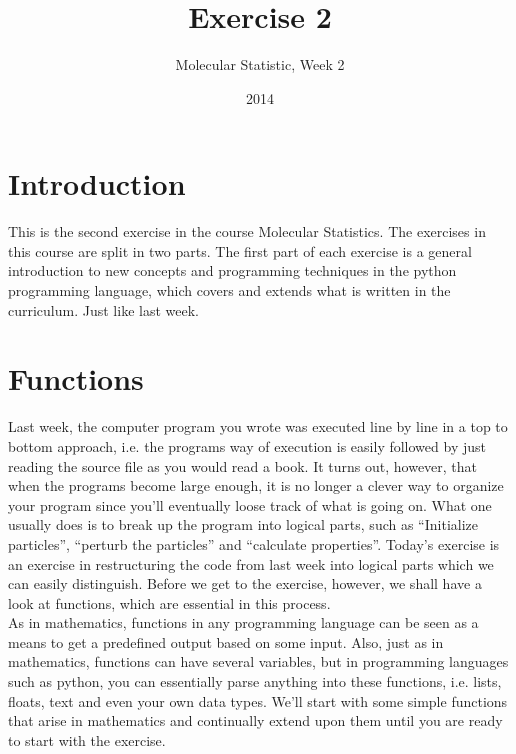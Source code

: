 \documentclass{article}
\title{Exercise 2}
\author{Molecular Statistic, Week 2}
\date{2014}
\begin{document}

\maketitle

\section{Introduction}

This is the second exercise in the course Molecular Statistics. The exercises
in this course are split in two parts. The first part of each exercise is a
general introduction to new concepts and programming techniques in the python
programming language, which covers and extends what is written in the
curriculum.
Just like last week.

\section{Functions}

Last week, the computer program you wrote was executed line by line in a top to
bottom approach, i.e. the programs way of execution is easily followed by just
reading the source file as you would read a book. It turns out, however, that
when the programs become large enough, it is no longer a clever way to organize
your program since you'll eventually loose track of what is going on. What one
usually does is to break up the program into logical parts, such as “Initialize
particles”, “perturb the particles” and “calculate properties”. Today's
exercise is an exercise in restructuring the code
from last week into logical parts which we can easily distinguish. Before we
get to the exercise, however, we shall have a look at functions, which are
essential in this process.\\

As in mathematics, functions in any programming language can be seen as a
means to get a predefined output based on some input. Also, just as in
mathematics, functions can have several variables, but in programming languages
such as python, you can essentially parse anything into these
functions, i.e. lists, floats, text and even your own data types. We'll start with some simple functions that arise in mathematics and
continually extend upon them until you are ready to start with the exercise.\\
\end{document}
